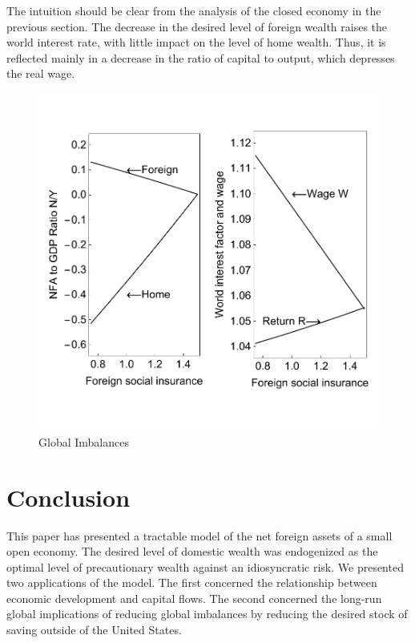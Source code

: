 \documentclass[titlepage]{\econtex}\newcommand{\texname}{cjSOE}
\begin{document}
The intuition should be clear from the analysis of the closed economy in the previous section. The decrease in the desired level of foreign wealth raises the world interest rate, with little impact on the level of home wealth. Thus, it is reflected mainly in a decrease in the ratio of capital to output, which depresses the real wage.

\medskip
\begin{figure}
\includegraphics{./Figures/globImb}
\caption{Global Imbalances}\label{fig:globImb}
\end{figure}
\medskip

\section{Conclusion}

This paper has presented a tractable model of the net foreign assets
of a small open economy. The desired level of domestic wealth was
endogenized as the optimal level of precautionary wealth against an
idiosyncratic risk. We presented two applications of the model. The
first concerned the relationship between economic development and
capital flows.  The second concerned the long-run global implications
of reducing global imbalances by reducing the desired stock of saving
outside of the United States.
\end{document}
